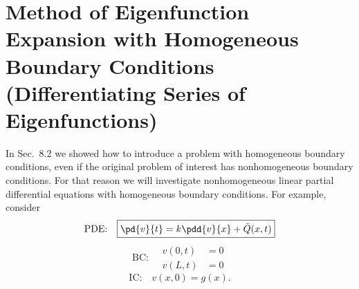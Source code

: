 \section{Method of Eigenfunction Expansion with Homogeneous Boundary Conditions (Differentiating Series of Eigenfunctions)}
\label{sec:eigenfunction-expansion-homog}

In Sec.~8.2 we showed how to introduce a problem with homogeneous boundary conditions, even if the original problem of interest has nonhomogeneous boundary conditions.  For that reason we will investigate nonhomogeneous linear partial differential equations with homogeneous boundary conditions.  For example, consider
\begin{equation}
\label{eq:8.3.1}
\text{PDE:}\quad \boxed{\pd{v}{t} = k\pdd{v}{x} + \bar{Q}(x,t)}
\end{equation}
\begin{equation}
\label{eq:8.3.2}
\text{BC:}\quad \boxed{\begin{aligned} v(0,t) &= 0 \\ v(L,t) &= 0 \end{aligned}}
\end{equation}
\begin{equation}
\label{eq:8.3.3}
\text{IC:}\quad \boxed{v(x,0) = g(x).}
\end{equation}

